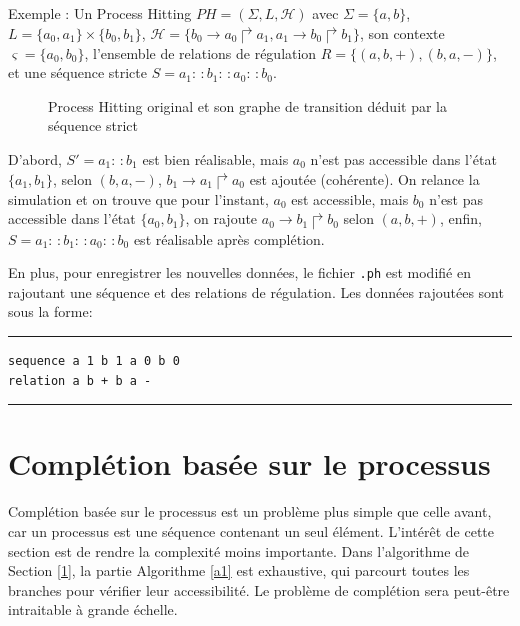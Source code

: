 \documentclass[11pt]{report}
\theoremstyle{definition}
\newcommand{\ac}[3]{$#1\to#2\Rsh#3$}
\newcommand{\acm}[3]{#1\to#2\Rsh#3}
\begin{document}
Exemple : 
Un Process Hitting $PH=(\Sigma,L,\mathscr{H})$ avec $\Sigma=\{a,b\}$, $L=\{a_0,a_1\}\times\{b_0,b_1\}$, $\mathscr{H}=\{\acm{b_0}{a_0}{a_1},\acm{a_1}{b_0}{b_1}\}$, son contexte $\varsigma=\{a_0,b_0\}$, l'ensemble de relations de r\'egulation $R=\{(a,b,+),(b,a,-)\}$, et une s\'equence stricte $S=a_1:\,:b_1:\,:a_0:\,:b_0$.

\begin{figure}[ht]
\centering
{}
\qquad
{}
\caption{Process Hitting original et son graphe de transition d\'eduit par la s\'equence strict}
\end{figure}
D'abord, $S'=a_1:\,:b_1$ est bien r\'ealisable, mais $a_0$ n'est pas accessible dans l'\'etat $\{a_1,b_1\}$, selon $(b,a,-)$, \ac{b_1}{a_1}{a_0} est ajout\'ee (coh\'erente). On relance la simulation et on trouve que pour l'instant, $a_0$ est accessible, mais $b_0$ n'est pas accessible dans l'\'etat $\{a_0,b_1\}$, on rajoute \ac{a_0}{b_1}{b_0} selon $(a,b,+)$, enfin, $S=a_1:\,:b_1:\,:a_0:\,:b_0$ est r\'ealisable apr\`es compl\'etion.

En plus, pour enregistrer les nouvelles donn\'ees, le fichier \texttt{.ph} est modifi\'e en rajoutant une s\'equence et des relations de r\'egulation. Les donn\'ees rajout\'ees sont sous la forme:
\vspace{0.2cm}
\hrule
\begin{verbatim}
sequence a 1 b 1 a 0 b 0
relation a b + b a -
\end{verbatim}
\hrule
\section{Compl\'etion bas\'ee sur le processus}
Compl\'etion bas\'ee sur le processus est un probl\`eme plus simple que celle avant, car un processus est une s\'equence contenant un seul \'el\'ement. L'int\'er\^et de cette section est de rendre la complexit\'e moins importante. Dans l'algorithme de Section \ref{1}, la partie Algorithme \ref{a1} est exhaustive, qui parcourt toutes les branches pour v\'erifier leur accessibilit\'e. Le probl\`eme de compl\'etion sera peut-\^etre intraitable \`a grande \'echelle.
\end{document}
